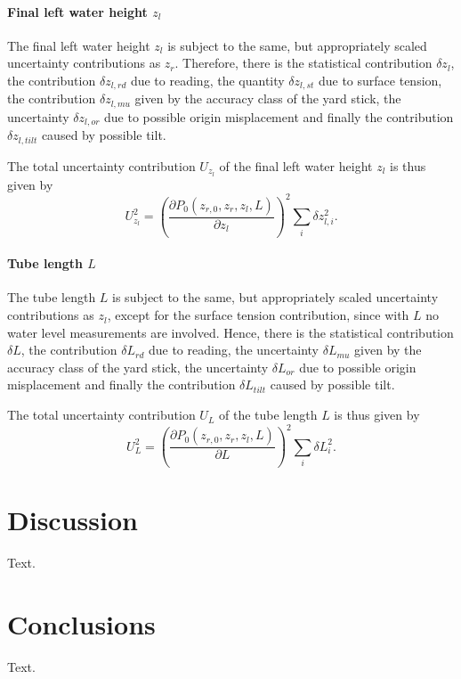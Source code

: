 \documentclass[a4paper,11pt, twocolumn]{article}
\begin{document}
\paragraph{Final left water height $z_l$} The final left water height $z_l$ is subject to the same, but appropriately scaled uncertainty contributions as $z_{r}$. Therefore, there is the statistical contribution $\delta z_l$, the contribution $\delta z_{l,rd}$ due to reading, the quantity $\delta z_{l,st}$ due to surface tension, the contribution $\delta z_{l,mu}$ given by the accuracy class of the yard stick, the uncertainty $\delta z_{l,or}$ due to possible origin misplacement and finally the contribution $\delta z_{l,tilt}$ caused by possible tilt.

The total uncertainty contribution $U_{z_{l}}$ of the final left water height $z_{l}$ is thus given by \begin{equation}
	U_{z_{l}}^2 = \left(\frac{\partial P_0(z_{r,0}, z_r, z_l, L)}{\partial z_{l}}\right)^2\sum_{i}\delta z_{l,i}^2.
\end{equation}

\paragraph{Tube length $L$} The tube length $L$ is subject to the same, but appropriately scaled uncertainty contributions as $z_{l}$, except for the surface tension contribution, since with $L$ no water level measurements are involved. Hence, there is the statistical contribution $\delta L$, the contribution $\delta L_{rd}$ due to reading, the uncertainty $\delta L_{mu}$ given by the accuracy class of the yard stick, the uncertainty $\delta L_{or}$ due to possible origin misplacement and finally the contribution $\delta L_{tilt}$ caused by possible tilt.

The total uncertainty contribution $U_{L}$ of the tube length $L$ is thus given by \begin{equation}
	U_{L}^2 = \left(\frac{\partial P_0(z_{r,0}, z_r, z_l, L)}{\partial L}\right)^2\sum_{i}\delta L_{i}^2.
\end{equation}

\section{Discussion}
Text.

\section{Conclusions}
Text.
\end{document}
